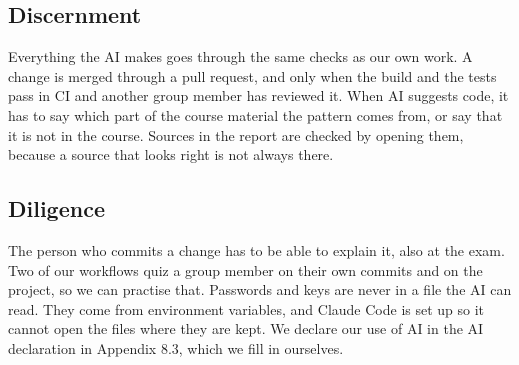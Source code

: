 \subsection{Discernment}

Everything the AI makes goes through the same checks as our own work. A change is
merged through a pull request, and only when the build and the tests pass in CI and
another group member has reviewed it. When AI suggests code, it has to say which part
of the course material the pattern comes from, or say that it is not in the course.
Sources in the report are checked by opening them, because a source that looks right
is not always there.

\subsection{Diligence}

The person who commits a change has to be able to explain it, also at the exam. Two
of our workflows quiz a group member on their own commits and on the project, so we
can practise that. Passwords and keys are never in a file the AI can read. They come
from environment variables, and Claude Code is set up so it cannot open the files
where they are kept. We declare our use of AI in the AI declaration in Appendix 8.3, which
we fill in ourselves.
